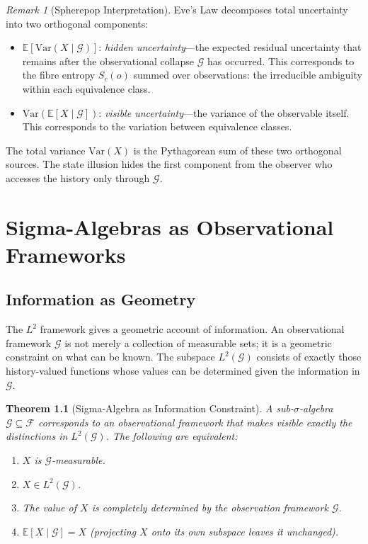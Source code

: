 \documentclass[12pt, a4paper, openany]{book}
\theoremstyle{plain}
\newtheorem{theorem}{Theorem}[chapter]
\theoremstyle{definition}
\theoremstyle{remark}
\newtheorem{remark}[theorem]{Remark}
\begin{document}
\begin{remark}[Spherepop Interpretation]
Eve's Law decomposes total uncertainty into two orthogonal components:
\begin{itemize}
\item $\mathbb{E}[\mathrm{Var}(X\mid\mathcal{G})]$: \emph{hidden uncertainty}---the
expected residual uncertainty that remains after the observational collapse
$\mathcal{G}$ has occurred. This corresponds to the fibre entropy $S_c(o)$ summed
over observations: the irreducible ambiguity within each equivalence class.
\item $\mathrm{Var}(\mathbb{E}[X\mid\mathcal{G}])$: \emph{visible uncertainty}---the
variance of the observable itself. This corresponds to the variation between
equivalence classes.
\end{itemize}
The total variance $\mathrm{Var}(X)$ is the Pythagorean sum of these two orthogonal
sources. The state illusion hides the first component from the observer who
accesses the history only through $\mathcal{G}$.
\end{remark}

\chapter{Sigma-Algebras as Observational Frameworks}

\section{Information as Geometry}

The $L^2$ framework gives a geometric account of information. An observational
framework $\mathcal{G}$ is not merely a collection of measurable sets; it is a
geometric constraint on what can be known. The subspace $L^2(\mathcal{G})$
consists of exactly those history-valued functions whose values can be determined
given the information in $\mathcal{G}$.

\begin{theorem}[Sigma-Algebra as Information Constraint]
A sub-$\sigma$-algebra $\mathcal{G} \subseteq \mathcal{F}$ corresponds to an
observational framework that makes visible exactly the distinctions in
$L^2(\mathcal{G})$. The following are equivalent:
\begin{enumerate}
\item $X$ is $\mathcal{G}$-measurable.
\item $X \in L^2(\mathcal{G})$.
\item The value of $X$ is completely determined by the observation framework $\mathcal{G}$.
\item $\mathbb{E}[X \mid \mathcal{G}] = X$ (projecting $X$ onto its own subspace leaves it unchanged).
\end{enumerate}
\end{theorem}
\end{document}
